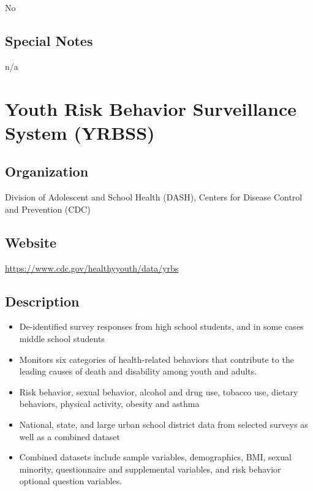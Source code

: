 \documentclass[
]{book}
\providecommand{\tightlist}{%
  \setlength{\itemsep}{0pt}\setlength{\parskip}{0pt}}
\begin{document}
No

\hypertarget{special-notes-96}{%
\section{Special Notes}\label{special-notes-96}}

n/a

\mainmatter

\hypertarget{youth-risk-behavior-surveillance-system-yrbss}{%
\chapter{Youth Risk Behavior Surveillance System (YRBSS)}\label{youth-risk-behavior-surveillance-system-yrbss}}

\hypertarget{organization-97}{%
\section{Organization}\label{organization-97}}

Division of Adolescent and School Health (DASH), Centers for Disease Control and Prevention (CDC)

\hypertarget{website-97}{%
\section{Website}\label{website-97}}

\url{https://www.cdc.gov/healthyyouth/data/yrbs}

\hypertarget{description-97}{%
\section{Description}\label{description-97}}

\begin{itemize}
\tightlist
\item
  De-identified survey responses from high school students, and in some cases middle school students
\item
  Monitors six categories of health-related behaviors that contribute to the leading causes of death and disability among youth and adults.
\item
  Risk behavior, sexual behavior, alcohol and drug use, tobacco use, dietary behaviors, physical activity, obesity and asthma
\item
  National, state, and large urban school district data from selected surveys as well as a combined dataset
\item
  Combined datasets include sample variables, demographics, BMI, sexual minority, questionnaire and supplemental variables, and risk behavior optional question variables.
\end{itemize}
\end{document}
